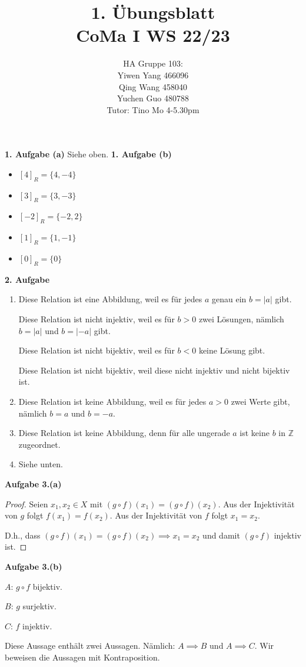 \documentclass[12pt]{extarticle}
\author{HA Gruppe 103: \\Yiwen Yang 466096\\Qing Wang 458040\\Yuchen Guo 480788\\Tutor: Tino Mo 4-5.30pm}
\title{1. Übungsblatt\\\small CoMa I WS 22/23}
\date{}
\begin{document}
\maketitle
\newpage
\textbf{1. Aufgabe (a)}
Siehe oben.
\textbf{1. Aufgabe (b)}
\begin{itemize}
\item \([4]_{R}=\{4,-4\}\)
\item \([3]_{R}=\{3,-3\}\)
\item \([-2]_{R}=\{-2,2\}\)
\item \([1]_{R}=\{1,-1\}\)
\item \([0]_{R}=\{0\}\)
\end{itemize}
\textbf{2. Aufgabe}
\begin{enumerate}
\item Diese Relation ist eine Abbildung, weil es für jedes \(a\) genau
  ein \(b=|a|\) gibt.

  Diese Relation ist nicht injektiv, weil es für \(b>0\) zwei Lösungen,
  nämlich \(b=|a|\) und \(b=|-a|\) gibt.

  Diese Relation ist nicht bijektiv, weil es für \(b<0\) keine Lösung
  gibt.

  Diese Relation ist nicht bijektiv, weil diese nicht injektiv und
  nicht bijektiv ist.
\item Diese Relation ist keine Abbildung, weil es für jedes \(a>0\) zwei
  Werte gibt, nämlich \(b=a\) und \(b=-a\).
\item Diese Relation ist keine Abbildung, denn für alle ungerade \(a\)
  ist keine \(b\) in \(\mathbb{Z}\) zugeordnet.
\item Siehe unten.
\end{enumerate}
\textbf{Aufgabe 3.(a)}
\begin{proof}
  Seien \(x_1,x_2 \in X\) mit \((g \circ f)(x_1)=(g \circ f)(x_2)\).
  Aus der Injektivität von \(g\) folgt \(f(x_1)=f(x_2)\).
  Aus der Injektivität von \(f\) folgt \(x_1=x_2\).

  D.h., dass  \((g \circ f)(x_1)=(g \circ f)(x_2) \implies x_1=x_2\) und
  damit  \((g \circ f)\) injektiv ist.
\end{proof}

\textbf{Aufgabe 3.(b)}


\(A\): \(g \circ f\) bijektiv.

\(B\): \(g\) surjektiv.

\(C\): \(f\) injektiv.

Diese Aussage enthält zwei Aussagen.  Nämlich: \(A \implies B\) und $A
\implies C$.  Wir beweisen die Aussagen mit Kontraposition.
\end{document}
